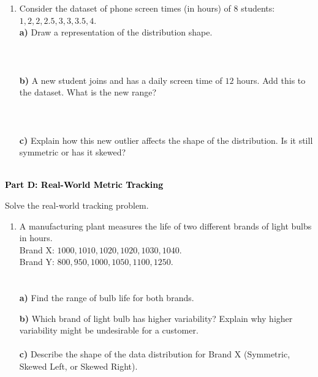 \documentclass[12pt, letterpaper, fleqn]{article}
\begin{document}
\begin{enumerate}[itemsep=2.5cm, leftmargin=0.6cm]
\item Consider the dataset of phone screen times (in hours) of 8 students: $1, 2, 2, 2.5, 3, 3, 3.5, 4$. \\
\textbf{a)} Draw a representation of the distribution shape. \\ \\ \\
 \\
\textbf{b)} A new student joins and has a daily screen time of $12$ hours. Add this to the dataset. What is the new range? \\ \\
 \\ \\
\textbf{c)} Explain how this new outlier affects the shape of the distribution. Is it still symmetric or has it skewed? \\ \\

\end{enumerate}

\newpage

\begin{tcolorbox}[colback=black!10]
    \large\textcolor{black}{\textbf{Part D: Real-World Metric Tracking}}
\end{tcolorbox}

\vspace{3mm}

\noindent
Solve the real-world tracking problem.

\vspace{5mm}

\begin{enumerate}[itemsep=2.5cm, leftmargin=0.6cm]
\item A manufacturing plant measures the life of two different brands of light bulbs in hours. \\
Brand X: $1000, 1010, 1020, 1020, 1030, 1040$. \\
Brand Y: $800, 950, 1000, 1050, 1100, 1250$.  \\  \\ \\
\textbf{a)} Find the range of bulb life for both brands. \\
\vspace{4cm}

\textbf{b)} Which brand of light bulb has higher variability? Explain why higher variability might be undesirable for a customer. \\
\vspace{4cm} \\
\textbf{c)} Describe the shape of the data distribution for Brand X (Symmetric, Skewed Left, or Skewed Right). \\
\vspace{4cm}
\end{enumerate}
\end{document}
